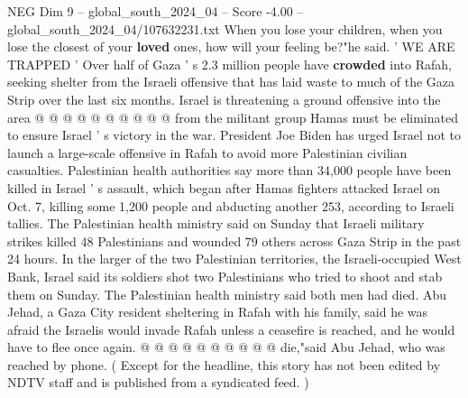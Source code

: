 \begin{textsample}{NEG Dim 9 – global\_south\_2024\_04 – Score -4.00 – global\_south\_2024\_04/107632231.txt}
When you lose your children, when you lose the closest of your \textbf{loved} ones, how will your feeling be?"he said. ' WE ARE TRAPPED ' Over half of Gaza ' s 2.3 million people have \textbf{crowded} into Rafah, seeking shelter from the Israeli offensive that has laid waste to much of the Gaza Strip over the last six months.
Israel is threatening a ground offensive into the area @ @ @ @ @ @ @ @ @ @ from the militant group Hamas must be eliminated to ensure Israel ' s victory in the war.
President Joe Biden has urged Israel not to launch a large-scale offensive in Rafah to avoid more Palestinian civilian casualties.
Palestinian health authorities say more than 34,000 people have been killed in Israel ' s assault, which began after Hamas fighters attacked Israel on Oct. 7, killing some 1,200 people and abducting another 253, according to Israeli tallies.
The Palestinian health ministry said on Sunday that Israeli military strikes killed 48 Palestinians and wounded 79 others across Gaza Strip in the past 24 hours.
In the larger of the two Palestinian territories, the Israeli-occupied West Bank, Israel said its soldiers shot two Palestinians who tried to shoot and stab them on Sunday.
The Palestinian health ministry said both men had died.
Abu Jehad, a Gaza City resident sheltering in Rafah with his family, said he was afraid the Israelis would invade Rafah unless a ceasefire is reached, and he would have to flee once again. @ @ @ @ @ @ @ @ @ @ die,"said Abu Jehad, who was reached by phone. ( Except for the headline, this story has not been edited by NDTV staff and is published from a syndicated feed. )

\end{textsample}
